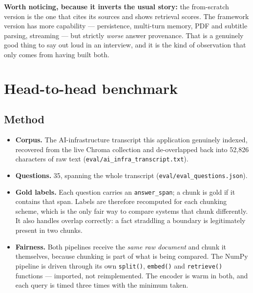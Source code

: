 \documentclass[11pt,a4paper]{article}
\begin{document}
\noindent
\textbf{Worth noticing, because it inverts the usual story:} the from-scratch
version is the one that cites its sources and shows retrieval scores. The
framework version has more capability --- persistence, multi-turn memory, PDF and
subtitle parsing, streaming --- but strictly \emph{worse} answer provenance. That
is a genuinely good thing to say out loud in an interview, and it is the kind of
observation that only comes from having built both.

\section{Head-to-head benchmark}\label{sec:bench}

\subsection{Method}

\begin{itemize}
  \item \textbf{Corpus.} The AI-infrastructure transcript this application
        genuinely indexed, recovered from the live Chroma collection and
        de-overlapped back into 52{,}826 characters of raw text
        (\texttt{eval/ai\_infra\_transcript.txt}).
  \item \textbf{Questions.} 35, spanning the whole transcript
        (\texttt{eval/eval\_questions.json}).
  \item \textbf{Gold labels.} Each question carries an \texttt{answer\_span}; a
        chunk is gold if it contains that span. Labels are therefore recomputed
        for each chunking scheme, which is the only fair way to compare systems
        that chunk differently. It also handles overlap correctly: a fact
        straddling a boundary is legitimately present in two chunks.
  \item \textbf{Fairness.} Both pipelines receive the \emph{same raw document}
        and chunk it themselves, because chunking is part of what is being
        compared. The NumPy pipeline is driven through its own
        \texttt{split()}, \texttt{embed()} and \texttt{retrieve()} functions ---
        imported, not reimplemented. The encoder is warm in both, and each query
        is timed three times with the minimum taken.
\end{itemize}
\end{document}
